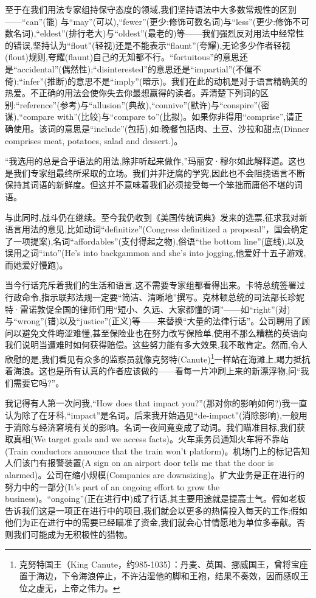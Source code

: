 至于在我们用法专家组持保守态度的领域,我们坚持语法中大多数常规性的区别——“can”(能) 与“may”(可以),“fewer”(更少:修饰可数名词)与“less”(更少:修饰不可数名词),“eldest”(排行老大)与“oldest”(最老的)等——我们强烈反对用法中经常性的错误,坚持认为“flout”(轻视)还是不能表示“flaunt”(夸耀),无论多少作者轻视(flout)规则,夸耀(flaunt)自己的无知都不行。“fortuitous”的意思还是“accidental”(偶然性);“disinterested”的意思还是“impartial”(不偏不倚);“infer”(推断)的意思不是“imply”(暗示)。我们在此的动机是对于语言精确美的热爱。不正确的用法会使你失去你最想赢得的读者。弄清楚下列词的区别:“reference”(参考)与“allusion”(典故),“connive”(默许)与“conspire”(密谋),“compare with”(比较)与“compare to”(比拟)。如果你非得用“comprise”,请正确使用。该词的意思是“include”(包括),如:晚餐包括肉、土豆、沙拉和甜点(Dinner comprises meat, potatoes, salad and dessert.)。

“我选用的总是合乎语法的用法,除非听起来做作,”玛丽安·穆尔如此解释道。这也是我们专家组最终所采取的立场。我们并非迂腐的学究,因此也不会阻挠语言不断保持其词语的新鲜度。但这并不意味着我们必须接受每一个笨拙而庸俗不堪的词语。

与此同时,战斗仍在继续。至今我仍收到《美国传统词典》发来的选票,征求我对新语言用法的意见,比如动词“definitize”(Congress definitized a proposal”，国会确定了一项提案),名词“affordables”(支付得起之物),俗语“the bottom line”(底线),以及误用之词“into”(He’s into backgammon and she’s into jogging,他爱好十五子游戏,而她爱好慢跑)。

当今行话充斥着我们的生活和语言,这不需要专家组都看得出来。卡特总统签署过行政命令,指示联邦法规一定要“简洁、清晰地”撰写。克林顿总统的司法部长珍妮特·雷诺敦促全国的律师们用“短小、久远、大家都懂的词”——如“right”(对)与“wrong”(错)以及“justice”(正义)等——来替换“大量的法律行话”。公司聘用了顾问以避免文件晦涩难懂,甚至保险业也在努力改写保险单,使用不那么糟糕的英语向我们说明当遭难时如何获得赔偿。这些努力能有多大效果,我不敢肯定。然而,令人欣慰的是,我们看见有众多的监察员就像克努特(Canute)\footnote{克努特国王（King Canute，约985-1035）：丹麦、英国、挪威国王，曾将宝座置于海边，下令海浪停止，不许沾湿他的脚和王袍，结果不奏效，因而感叹王位之虚无，上帝之伟力。}一样站在海滩上,竭力抵抗着海浪。这也是所有认真的作者应该做的——看每一片冲刷上来的新漂浮物,问“我们需要它吗?”。

我记得有人第一次问我,“How does that impact you?”(那对你的影响如何?)我一直认为除了在牙科,“impact”是名词。后来我开始遇见“de-impact”(消除影响),一般用于消除与经济窘境有关的影响。名词一夜间竟变成了动词。我们瞄准目标,我们获取真相(We target goals and we access facts)。火车乘务员通知火车将不靠站(Train conductors announce that the train won’t platform)。机场门上的标记告知人们该门有报警装置(A sign on an airport door tells me that the door is alarmed)。公司在缩小规模(Companies are downsizing)。扩大业务是正在进行的努力中的一部分(It’s part of an ongoing effort to grow the business)。“ongoing”(正在进行中)成了行话,其主要用途就是提高士气。假如老板告诉我们这是一项正在进行中的项目,我们就会以更多的热情投入每天的工作;假如他们为正在进行中的需要已经瞄准了资金,我们就会心甘情愿地为单位多奉献。否则我们可能成为无积极性的猎物。

